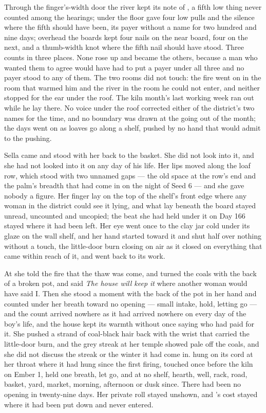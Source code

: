 Through the finger's-width door the river kept its note of , a fifth low thing never counted among the hearings; under the floor  gave four low pulls and the silence where the fifth should have been, its payer without a name for two hundred and nine days; overhead the boards kept four nails on the near board, four on the next, and a thumb-width knot where the fifth nail should have stood. Three counts in three places. None rose up and became the others, because a man who wanted them to agree would have had to put a payer under all three and no payer stood to any of them. The two rooms did not touch: the fire went on in the room that warmed him and the river in the room he could not enter, and neither stopped for the ear under the roof. The kiln month's last working week ran out while he lay there. No voice under the roof corrected either of the district's two names for the time, and no boundary was drawn at the going out of the month; the days went on as loaves go along a shelf, pushed by no hand that would admit to the pushing.

Sella came and stood with her back to the basket. She did not look into it, and she had not looked into it on any day of his life. Her lips moved along the loaf row, which stood with two unnamed gaps --- the old space at the row's end and the palm's breadth that had come in on the night of Seed 6 --- and she gave nobody a figure. Her finger lay on the top of the shelf's front edge where any woman in the district could see it lying, and what lay beneath the board stayed unread, uncounted and uncopied; the beat she had held under it on Day 166 stayed where it had been left. Her eye went once to the clay jar cold under its glaze on the wall shelf, and her hand started toward it and shut half over nothing without a touch, the little-door burn closing on air as it closed on everything that came within reach of it, and went back to its work.

At  she told the fire that the thaw was come, and turned the coals with the back of a broken pot, and said \emph{The house will keep it} where another woman would have said I. Then she stood a moment with the back of the pot in her hand and counted under her breath toward no opening --- small intake, hold, letting go --- and the count arrived nowhere as it had arrived nowhere on every day of the boy's life, and the house kept its warmth without once saying who had paid for it. She pushed a strand of coal-black hair back with the wrist that carried the little-door burn, and the grey streak at her temple showed pale off the coals, and she did not discuss the streak or the winter it had come in.  hung on its cord at her throat where it had hung since the first firing, touched once before the kiln on Ember 1, held one breath, let go, and at no shelf, hearth, well, rack, road, basket, yard, market, morning, afternoon or dusk since. There had been no opening in twenty-nine days. Her private roll stayed unshown, and 's cost stayed where it had been put down and never entered.

